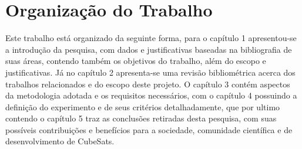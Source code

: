 \section{Organização do Trabalho}
Este trabalho está organizado da seguinte forma, para o capítulo 1 apresentou-se a introdução da pesquisa, com dados e justificativas baseadas na bibliografia de suas áreas, contendo também os objetivos do trabalho, além do escopo e justificativas. Já no capítulo 2 apresenta-se uma revisão bibliométrica acerca dos trabalhos relacionados e do escopo deste projeto. O capítulo 3 contém aspectos da metodologia adotada e os requisitos necessários, com o  capítulo 4 
possuindo a definição do experimento e de seus  critérios detalhadamente, que por ultimo contendo o capítulo 5 traz as conclusões retiradas desta pesquisa, com suas possíveis contribuições e benefícios para a sociedade, comunidade científica e de desenvolvimento de  CubeSats.


